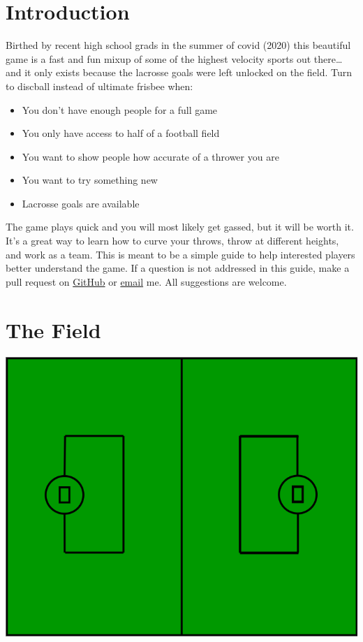 \documentclass[10pt]{article}
\begin{document}
\renewcommand*\contentsname{Table of Contents}
\tableofcontents

\newpage

\section{Introduction}

Birthed by recent high school grads in the summer of covid (2020) this beautiful game is a fast and fun mixup of some of the highest velocity sports out there\ldots and it only exists because the lacrosse goals were left unlocked on the field. Turn to discball instead of ultimate frisbee when:

\begin{itemize}
    \item You don't have enough people for a full game
    \item You only have access to half of a football field
    \item You want to show people how accurate of a thrower you are
    \item You want to try something new
    \item Lacrosse goals are available
\end{itemize}

The game plays quick and you will most likely get gassed, but it will be worth it. It's a great way to learn how to curve your throws, throw at different heights, and work as a team. This is meant to be a simple guide to help interested players better understand the game. If a question is not addressed in this guide, make a pull request on \href{https://github.com/tjcoppola234/Discball}{GitHub} or \href{mailto:tjcoppola234@gmail.com}{email} me. All suggestions are welcome.

\section{The Field}

\includegraphics[width=.7\textwidth]{field/field}
\end{document}
